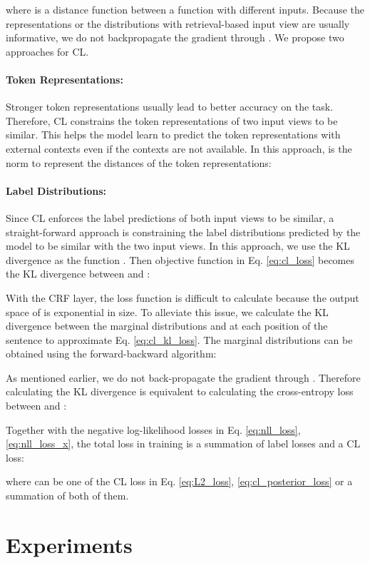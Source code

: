 \documentclass[11pt,a4paper]{article}
\begin{document}
where  is a distance function between a function  with different inputs. Because the representations or the distributions with retrieval-based input view are usually informative, we do not backpropagate the gradient through . We propose two approaches for CL.

\paragraph{Token Representations:} Stronger token representations usually lead to better accuracy on the task. Therefore, CL constrains the token representations of two input views to be similar. This helps the model learn to predict the token representations with external contexts even if the contexts are not available. In this approach,  is the  norm to represent the distances of the token representations:


\paragraph{Label Distributions:} Since CL enforces the label predictions of both input views to be similar, a straight-forward approach is constraining the label distributions predicted by the model to be similar with the two input views. In this approach, we use the KL divergence as the function . Then objective function in Eq. \ref{eq:cl_loss} becomes the KL divergence between  and :

With the CRF layer, the loss function is difficult to calculate because the output space of  is exponential in size. To alleviate this issue, we calculate the KL divergence between the marginal distributions  and  at each position of the sentence to approximate Eq. \ref{eq:cl_kl_loss}. The marginal distributions can be obtained using the forward-backward algorithm:

As mentioned earlier, we do not back-propagate the gradient through . Therefore calculating the KL divergence is equivalent to calculating the cross-entropy loss between  and :

Together with the negative log-likelihood losses in Eq. \ref{eq:nll_loss}, \ref{eq:nll_loss_x}, the total loss in training is a summation of label losses and a CL loss:

where  can be one of the CL loss in Eq. \ref{eq:L2_loss}, \ref{eq:cl_posterior_loss} or a summation of both of them.

\section{Experiments}
\end{document}
